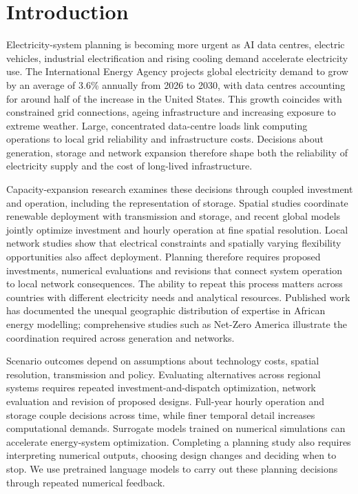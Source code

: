 \documentclass[pdflatex,sn-nature]{sn-jnl}
\begin{document}
\section{Introduction}\label{sec:introduction}

Electricity-system planning is becoming more urgent as AI data centres, electric vehicles, industrial electrification and rising cooling demand accelerate electricity use. The International Energy Agency projects global electricity demand to grow by an average of 3.6\% annually from 2026 to 2030, with data centres accounting for around half of the increase in the United States\cite{iea2026electricity}. This growth coincides with constrained grid connections, ageing infrastructure and increasing exposure to extreme weather. Large, concentrated data-centre loads link computing operations to local grid reliability and infrastructure costs\cite{colangelo2026gridassets}. Decisions about generation, storage and network expansion therefore shape both the reliability of electricity supply and the cost of long-lived infrastructure.

Capacity-expansion research examines these decisions through coupled investment and operation, including the representation of storage\cite{levin2023storage}. Spatial studies coordinate renewable deployment with transmission and storage\cite{wang2023transition}, and recent global models jointly optimize investment and hourly operation at fine spatial resolution\cite{zhu2026netzero}. Local network studies show that electrical constraints and spatially varying flexibility opportunities also affect deployment\cite{few2024localnetworks,brockway2021gridlimits}. Planning therefore requires proposed investments, numerical evaluations and revisions that connect system operation to local network consequences. The ability to repeat this process matters across countries with different electricity needs and analytical resources. Published work has documented the unequal geographic distribution of expertise in African energy modelling\cite{dioha2023africa}; comprehensive studies such as Net-Zero America illustrate the coordination required across generation and networks\cite{larson2021netzero}.

Scenario outcomes depend on assumptions about technology costs, spatial resolution, transmission and policy\cite{beiter2023expanded}. Evaluating alternatives across regional systems requires repeated investment-and-dispatch optimization, network evaluation and revision of proposed designs. Full-year hourly operation and storage couple decisions across time, while finer temporal detail increases computational demands\cite{hoffmann2022pareto}. Surrogate models trained on numerical simulations can accelerate energy-system optimization\cite{prina2024surrogate}. Completing a planning study also requires interpreting numerical outputs, choosing design changes and deciding when to stop. We use pretrained language models to carry out these planning decisions through repeated numerical feedback.
\end{document}
